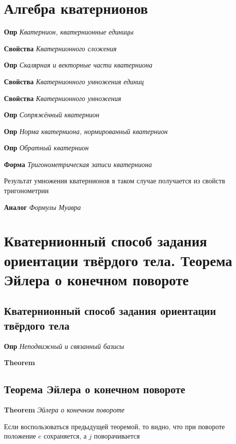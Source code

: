 \documentclass[a4paper, 14pt]{article}
\begin{document}
    \section{Алгебра кватернионов}
    
    \textbf{Опр} \textit{Кватернион, кватернионные единицы}
    
    \textbf{Свойства} \textit{Кватернионного сложения}
    
    \textbf{Опр} \textit{Скалярная и векторные части кватерниона}
    
    \textbf{Свойства} \textit{Кватернионного умножения единиц}
    
    \textbf{Свойства} \textit{Кватернионного умножения}
    
    \textbf{Опр} \textit{Сопряжённый кватернион}
    
    \textbf{Опр} \textit{Норма кватерниона, нормированный кватернион}
    
    \textbf{Опр} \textit{Обратный кватернион}
    
    \textbf{Форма} \textit{Тригонометрическая записи кватерниона}
    
    Результат умножения кватернионов в таком случае получается из свойств тригонометрии
    
    \textbf{Аналог} \textit{Формулы Муавра}
    
    \section{Кватернионный способ задания ориентации твёрдого тела.
    Теорема Эйлера о конечном повороте}
    
    \subsection{Кватернионный способ задания ориентации твёрдого тела}
    
    \textbf{Опр} \textit{Неподвижный и связанный базисы}
    
    \textbf{Theorem}
    
    \subsection{Теорема Эйлера о конечном повороте}
    
    \textbf{Theorem} \textit{Эйлера о конечном повороте}
    
    Если воспользоваться предыдущей теоремой, то видно, что при повороте положение $e$ сохраняется, а $j$ поворачивается
    
\end{document}
